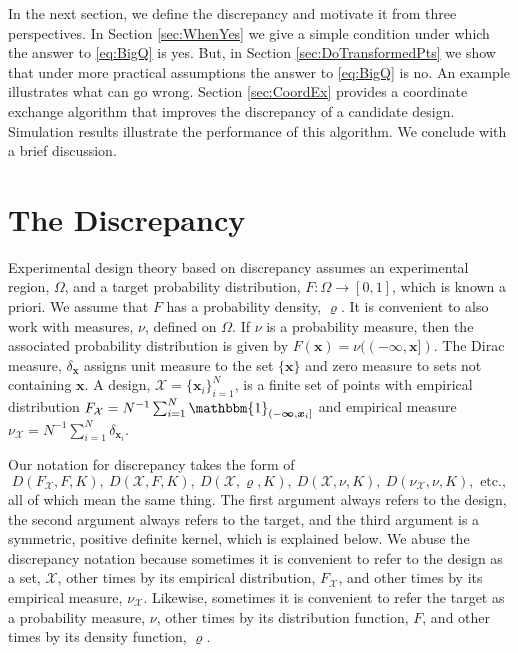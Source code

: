 \documentclass[graybox]{svmult}
\newcommand{\vx}{\boldsymbol{x}}
\newcommand{\vinfty}{\boldsymbol{\infty}}
\newcommand{\Xdes}{\mathcal{X}}
\newcommand{\Ftar}{F}
\newcommand{\ftar}{\varrho}
\newcommand{\bbone}{\mathbbm{1}}
\begin{document}
In the next section, we define the discrepancy and motivate it from three perspectives.  In Section \ref{sec:WhenYes} we give a simple condition under which the answer to \eqref{eq:BigQ} is yes.  But, in Section \ref{sec:DoTransformedPts} we show that under more practical assumptions the answer to \eqref{eq:BigQ} is no.  An example illustrates what can go wrong.  Section \ref{sec:CoordEx} provides a coordinate exchange algorithm that improves the discrepancy of a candidate design.  Simulation results illustrate the performance of this algorithm.  We conclude with a brief discussion.

\section{The Discrepancy} \label{sec:discrepancy}

Experimental design theory based on  discrepancy assumes an experimental region, $\Omega$, and a target probability distribution, $\Ftar:\Omega \to [0,1]$, which is known a priori. We assume that $\Ftar$ has a probability density, $\ftar$.  It is convenient to also work with measures, $\nu$, defined on $\Omega$.  If $\nu$ is a probability measure, then the associated probability distribution is given by $F(\vx) = \nu((-\vinfty,\vx])$.  The Dirac measure, $\delta_{\vx}$ assigns unit measure to the set $\{\vx\}$ and zero measure to sets not containing $\vx$.  A design, $\Xdes = \{\vx_i\}_{i=1}^N$, is a finite set of points with empirical distribution $F_{\Xdes}  = N^{-1} \sum_{i=1}^N \bbone_{(-\vinfty,\vx_i]}$ and empirical measure $\nu_{\Xdes}  = N^{-1} \sum_{i=1}^N \delta_{\vx_i}$.

Our notation for discrepancy takes the form of 
\[
 D(F_{\Xdes},F,K), \ D(\Xdes,F,K), \ D(\Xdes,\varrho,K), \ D(\Xdes,\nu,K), \ D(\nu_{\Xdes},\nu,K), \text{ etc.}, 
\]
all of which mean the same thing.  The first argument always refers to the design, the second argument always refers to the target, and the third argument is a symmetric, positive definite kernel, which is explained below.  We abuse the discrepancy notation because sometimes it is convenient to refer to the design as a set, $\Xdes$, other times by its empirical distribution, $F_{\Xdes}$, and other times by its empirical measure, $\nu_{\Xdes}$.  Likewise, sometimes it is convenient to refer the target as a probability measure,  $\nu$, other times by its distribution function, $F$, and other times by its density function, $\varrho$.
\end{document}
